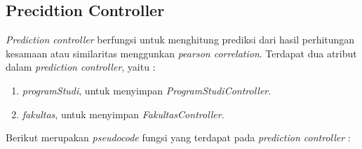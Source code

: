 \subsection{Precidtion Controller}
\label{subsec:prediction}

\textit{Prediction controller} berfungsi untuk menghitung prediksi dari hasil perhitungan kesamaan atau similaritas menggunkan \textit{pearson correlation}. Terdapat dua atribut dalam \textit{prediction controller}, yaitu :

\begin{enumerate}
    \item \textit{programStudi}, untuk menyimpan \textit{ProgramStudiController}.
    
    \item \textit{fakultas}, untuk menyimpan \textit{FakultasController}.
\end{enumerate}

Berikut merupakan \textit{pseudocode} fungsi yang terdapat pada \textit{prediction controller} :

